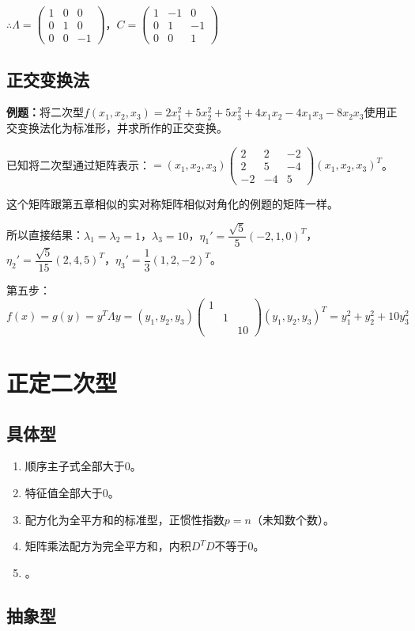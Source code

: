 \documentclass[UTF8, 12pt]{ctexart}
\begin{document}
$\therefore\Lambda=\left(\begin{array}{ccc}
    1 & 0 & 0 \\
    0 & 1 & 0 \\
    0 & 0 & -1
\end{array}\right)$，$C=\left(\begin{array}{ccc}
    1 & -1 & 0 \\
    0 & 1 & -1 \\
    0 & 0 & 1
\end{array}\right)$

\subsection{正交变换法}

\textbf{例题：}将二次型$f(x_1,x_2,x_3)=2x_1^2+5x_2^2+5x_3^2+4x_1x_2-4x_1x_3-8x_2x_3$使用正交变换法化为标准形，并求所作的正交变换。

已知将二次型通过矩阵表示：$=(x_1,x_2,x_3)\left(\begin{array}{ccc}
    2 & 2 & -2 \\
    2 & 5 & -4 \\
    -2 & -4 & 5
\end{array}\right)(x_1,x_2,x_3)^T$。\medskip

这个矩阵跟第五章相似的实对称矩阵相似对角化的例题的矩阵一样。

所以直接结果：$\lambda_1=\lambda_2=1$，$\lambda_3=10$，$\eta_1'=\dfrac{\sqrt{5}}{5}(-2,1,0)^T$，$\eta_2'=\dfrac{\sqrt{5}}{15}(2,4,5)^T$，$\eta_3'=\dfrac{1}{3}(1,2,-2)^T$。

第五步：$f(x)=g(y)=y^T\Lambda y=(y_1,y_2,y_3)\left(\begin{array}{ccc}
    1 \\
     & 1 \\
     & & 10
\end{array}\right)(y_1,y_2,y_3)^T=y_1^2+y_2^2+10y_3^2$

\section{正定二次型}

\subsection{具体型}

\begin{enumerate}
    \item 顺序主子式全部大于0。
    \item 特征值全部大于0。
    \item 配方化为全平方和的标准型，正惯性指数$p=n$（未知数个数）。
    \item 矩阵乘法配方为完全平方和，内积$D^TD$不等于0。
    \item 。
\end{enumerate}

\subsection{抽象型}
\end{document}
